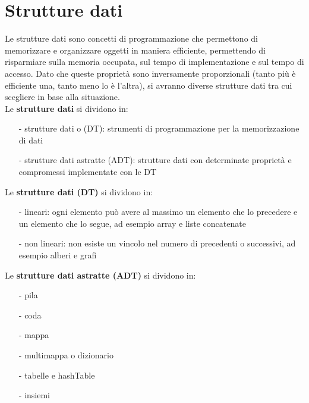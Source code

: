 \documentclass{article}
\begin{document}
\section{Strutture dati}
Le strutture dati sono concetti di programmazione che permettono di memorizzare e organizzare oggetti in maniera efficiente,
permettendo di risparmiare sulla memoria occupata, sul tempo di implementazione e sul tempo di accesso. Dato che queste
proprietà sono inversamente proporzionali (tanto più è efficiente una, tanto meno lo è l'altra), si avranno diverse strutture
dati tra cui scegliere in base alla situazione. \\
Le \textbf{strutture dati} si dividono in:
\begin{itemize} [topsep=3pt, itemsep=0pt]
	\item[-] strutture dati o (DT): strumenti di programmazione per la memorizzazione di dati
	\item[-] strutture dati astratte (ADT): strutture dati con determinate proprietà e compromessi implementate con le DT
\end{itemize}
Le \textbf{strutture dati (DT)} si dividono in:
\begin{itemize} [topsep=3pt, itemsep=0pt]
	\item[-] lineari: ogni elemento può avere al massimo un elemento che lo precedere e un elemento che lo segue, ad esempio
	array e liste concatenate
	\item[-] non lineari: non esiste un vincolo nel numero di precedenti o successivi, ad esempio alberi e grafi
\end{itemize}
Le \textbf{strutture dati astratte (ADT)} si dividono in:
\begin{itemize} [topsep=3pt, itemsep=0pt]
	\item[-] pila
	\item[-] coda
	\item[-] mappa
	\item[-] multimappa o dizionario
	\item[-] tabelle e hashTable
	\item[-] insiemi
\end{itemize}

\end{document}
